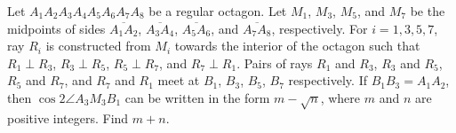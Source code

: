 Let $A_1 A_2 A_3 A_4 A_5 A_6 A_7 A_8$ be a regular octagon. Let $M_1$, $M_3$, $M_5$, and $M_7$ be the midpoints of sides $\overline{A_1 A_2}$, $\overline{A_3 A_4}$, $\overline{A_5 A_6}$, and $\overline{A_7 A_8}$, respectively. For $i = 1, 3, 5, 7$, ray $R_i$ is constructed from $M_i$ towards the interior of the octagon such that $R_1 \perp R_3$, $R_3 \perp R_5$, $R_5 \perp R_7$, and $R_7 \perp R_1$. Pairs of rays $R_1$ and $R_3$, $R_3$ and $R_5$, $R_5$ and $R_7$, and $R_7$ and $R_1$ meet at $B_1$, $B_3$, $B_5$, $B_7$ respectively. If $B_1 B_3 = A_1 A_2$, then $\cos 2 \angle A_3 M_3 B_1$ can be written in the form $m - \sqrt{n}$, where $m$ and $n$ are positive integers. Find $m + n$.